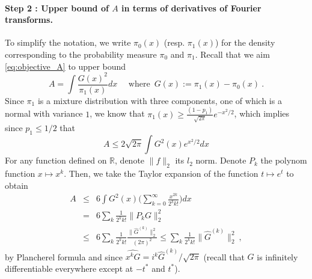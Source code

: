 \documentclass[twoside,11pt]{article}
\newcommand{\<}{\langle}
\renewcommand{\>}{\rangle}
\begin{document}
\paragraph{Step 2 : Upper bound of $A$ in terms of derivatives of Fourier transforms.}
To simplify the notation, we write $\pi_0(x)$ (resp. $\pi_1(x)$) for the density corresponding to the probability measure $\pi_0$ and $\pi_1$. Recall that we aim  \eqref{eq:objective_A} to upper bound 
\[A = \int \frac{G(x)^2}{\pi_1(x)}dx\quad \text{ where }\, G(x) := \pi_1(x) - \pi_0(x)\ .\]
Since $\pi_1$  is a mixture distribution with three components, one of which is a normal with variance $1$, we know that 
$\pi_1(x) \geq\tfrac{(1-p_1)}{\sqrt{2\pi }} e^{-x^2/2}$, which implies since $p_1\leq 1/2$ that  
\[A \leq 2 \sqrt{2\pi } \int G^2(x) e^{x^2/2} dx\]
For any function defined on $\mathbb{R}$, denote $\|f\|_2$ its $l_2$ norm. Denote $P_k$ the polynom function $x\mapsto x^k$. 
Then, we take the Taylor expansion of the function $t\mapsto e^t$ to obtain
\begin{eqnarray}
A &\leq& 6 \int G^2(x) \big(\sum_{k=0}^{\infty} \frac{x^{2k}}{2^k k!}\big) dx\nonumber\\
&= &6  \sum_k \frac{1}{2^k k!} \|P_kG\|_2^2\nonumber\\
&\leq& 6  \sum_k \frac{1}{2^k k!} \frac{\|\widehat{G}^{(k)}\|_2^2}{(2\pi)^2}\leq   \sum_k \frac{1}{2^k  k!} \|\widehat{G}^{(k)}\|_2^2\ ,\label{eq:Adist}
\end{eqnarray}
by Plancherel formula and since $\widehat{x^k G} = i^k \widehat{G}^{(k)}/\sqrt{2\pi}$ (recall that $G$ is infinitely differentiable everywhere except at $-t^*$ and $t^*$).
\end{document}
